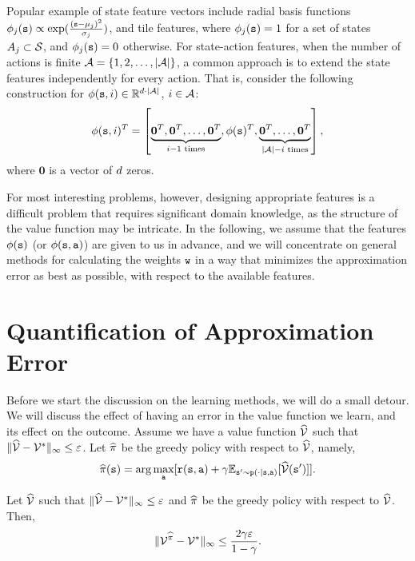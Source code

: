 Popular example of state feature vectors include radial basis functions $\phi_j({\tt s}) \propto \exp(\frac{({\tt s}-\mu_j)^2}{\sigma_j})$, and tile features, where $\phi_j({\tt s}) = 1$ for a set of states $A_j \subset \mathcal{S}$, and $\phi_j({\tt s}) = 0$ otherwise. For state-action features, when the number of actions is finite $\mathcal{A} = \left\{1,2,\dots,|\mathcal{A}|\right\}$, a common approach is to extend the state features independently for every action. That is, consider the following construction for $\phi({\tt s},i)\in \mathbb{R}^{d \cdot |\mathcal{A}|}$, $i\in \mathcal{A}$:
\begin{equation*}
    \phi({\tt s},i)^T = \left[ \underbrace{\mathbf{0}^T, \mathbf{0}^T, \dots, \mathbf{0}^T}_{i-1 \text{ times}}, \phi({\tt s})^T, \underbrace{\mathbf{0}^T, \dots, \mathbf{0}^T}_{|\mathcal{A}|-i \text{ times}}\right],
\end{equation*}
where $\mathbf{0}$ is a vector of $d$ zeros.

For most interesting problems, however, designing appropriate features is a difficult problem that requires significant domain knowledge, as the structure of the value function may be intricate. In the following, we assume that the features $\phi({\tt s})$ (or $\phi({\tt s},{\tt a})$) are given to us in advance, and we will concentrate on general methods for calculating the weights ${\tt w}$ in a way that minimizes the approximation error as best as possible, with respect to the available features. 

\section{Quantification of Approximation Error}

Before we start the discussion on the learning methods, we will do a
small detour. We will discuss the effect of having an error in the
value function we learn, and its effect on the outcome. Assume we
have a value function $\widehat{\mathcal{V}}$ such that $\|\widehat{\mathcal{V}}-\mathcal{V}^*\|_\infty\leq
\varepsilon$. Let $\widehat{\pi}$ be the greedy policy with respect to
$\widehat{\mathcal{V}}$, namely,
\[
\widehat{\pi}({\tt s})=\arg\max_{\tt a} [{\tt r}({\tt s},{\tt a})+\gamma
\mathbb{E}_{{\tt s}'\sim {\tt p}(\cdot|{\tt s},{\tt a})}[\widehat{\mathcal{V}}({\tt s}')]].
\]


\begin{theorem}\label{thm:approx_error}
Let $\widehat{\mathcal{V}}$ such that $\|\widehat{\mathcal{V}}-\mathcal{V}^*\|_\infty\leq \varepsilon$ and
$\widehat{\pi}$ be the greedy policy with respect to $\widehat{\mathcal{V}}$. Then,
\[
\|\mathcal{V}^{\widehat{\pi}}-\mathcal{V}^*\|_\infty\leq\frac{2\gamma\varepsilon}{1-\gamma}.
\]
\end{theorem}

